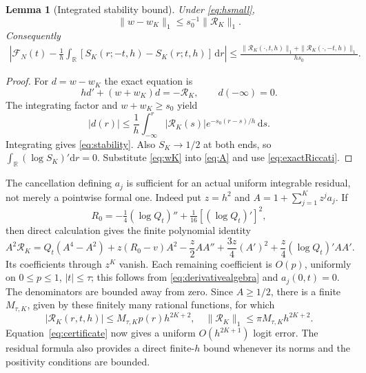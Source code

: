 \documentclass[10pt]{article}
\newtheorem{lemma}[theorem]{Lemma}
\newcommand{\dd}{\mathrm d}
\newcommand{\RR}{\mathbb R}
\begin{document}
\begin{lemma}[Integrated stability bound]\label{lem:stability}
Under \eqref{eq:hsmall},
\begin{equation}
\|w-w_K\|_1\le s_0^{-1}\|\mathcal R_K\|_1.
\label{eq:stability}
\end{equation}
Consequently
\begin{align}
\left|\mathcal F_N(t)-\frac1h\int_{\RR}
 [S_K(r;-t,h)-S_K(r;t,h)]\,\dd r\right|
\le\frac{\|\mathcal R_K(\cdot,t,h)\|_1+
             \|\mathcal R_K(\cdot,-t,h)\|_1}{hs_0}.
\label{eq:certificate}
\end{align}
\end{lemma}
\begin{proof}
For $d=w-w_K$ the exact equation is
\[
hd'+(w+w_K)d=-\mathcal R_K,\qquad d(-\infty)=0.
\]
The integrating factor and $w+w_K\ge s_0$ yield
\[
|d(r)|\le\frac1h\int_{-\infty}^r
 |\mathcal R_K(s)|e^{-s_0(r-s)/h}\,\dd s.
\]
Integrating gives \eqref{eq:stability}. Also $S_K\to1/2$ at both
ends, so $\int_{\RR}(\log S_K)'\dd r=0$. Substitute
\eqref{eq:wK} into \eqref{eq:A} and use \eqref{eq:exactRiccati}.
\end{proof}

The cancellation defining $a_j$ is sufficient for an actual
uniform integrable residual, not merely a pointwise formal one.
Indeed put $z=h^2$ and $A=1+\sum_{j=1}^K z^ja_j$.
If
\[
R_0=-\tfrac14(\log Q_t)''+\tfrac1{16}[(\log Q_t)']^2,
\]
then direct calculation gives the finite polynomial identity
\begin{equation}
A^2\mathcal R_K=Q_t(A^4-A^2)+z(R_0-v)A^2
 -\frac z2 AA''+\frac{3z}4(A')^2
 +\frac z4(\log Q_t)'AA'.
\label{eq:cleared}
\end{equation}
Its coefficients through $z^K$ vanish. Each remaining coefficient
is $O(p)$, uniformly on $0\le p\le1$, $|t|\le\tau$; this follows
from \eqref{eq:derivativealgebra} and $a_j(0,t)=0$.
The denominators are bounded away from zero. Since $A\ge1/2$,
there is a finite $M_{\tau,K}$, given by these finitely many
rational functions, for which
\begin{equation}
|\mathcal R_K(r,t,h)|\le M_{\tau,K}p(r)h^{2K+2},
\quad \|\mathcal R_K\|_1\le\pi M_{\tau,K}h^{2K+2}.
\label{eq:L1residual}
\end{equation}
Equation~\eqref{eq:certificate} now gives a uniform $O(h^{2K+1})$
logit error. The residual formula also provides a direct finite-$h$
bound whenever its norms and the positivity conditions are bounded.
\end{document}

